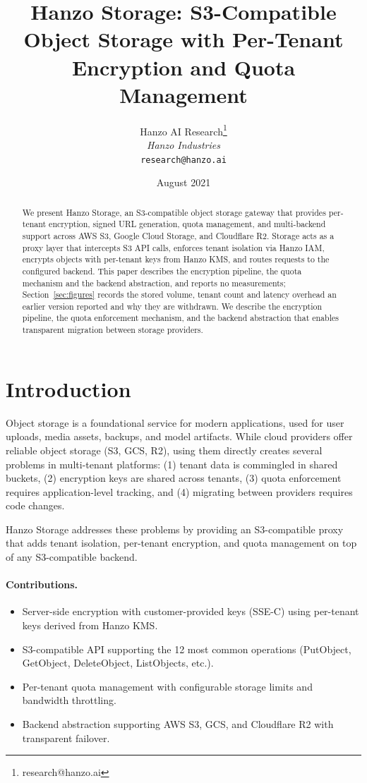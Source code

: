 \documentclass[11pt,twocolumn]{article}
\title{Hanzo Storage: S3-Compatible Object Storage with Per-Tenant Encryption and Quota Management}
\author{Hanzo AI Research\thanks{research@hanzo.ai} \\ \textit{Hanzo Industries} \\ \texttt{research@hanzo.ai}}
\date{August 2021}
\begin{document}
\hanzocoverpage

\begin{abstract}
We present Hanzo Storage, an S3-compatible object storage gateway that provides per-tenant encryption, signed URL generation, quota management, and multi-backend support across AWS S3, Google Cloud Storage, and Cloudflare R2. Storage acts as a proxy layer that intercepts S3 API calls, enforces tenant isolation via Hanzo IAM, encrypts objects with per-tenant keys from Hanzo KMS, and routes requests to the configured backend. This paper describes the encryption pipeline, the quota mechanism and the backend abstraction, and reports no measurements; Section~\ref{sec:figures} records the stored volume, tenant count and latency overhead an earlier version reported and why they are withdrawn. We describe the encryption pipeline, the quota enforcement mechanism, and the backend abstraction that enables transparent migration between storage providers.
\end{abstract}

\section{Introduction}

Object storage is a foundational service for modern applications, used for user uploads, media assets, backups, and model artifacts. While cloud providers offer reliable object storage (S3, GCS, R2), using them directly creates several problems in multi-tenant platforms: (1) tenant data is commingled in shared buckets, (2) encryption keys are shared across tenants, (3) quota enforcement requires application-level tracking, and (4) migrating between providers requires code changes.

Hanzo Storage addresses these problems by providing an S3-compatible proxy that adds tenant isolation, per-tenant encryption, and quota management on top of any S3-compatible backend.

\paragraph{Contributions.}
\begin{itemize}
    \item Server-side encryption with customer-provided keys (SSE-C) using per-tenant keys derived from Hanzo KMS.
    \item S3-compatible API supporting the 12 most common operations (PutObject, GetObject, DeleteObject, ListObjects, etc.).
    \item Per-tenant quota management with configurable storage limits and bandwidth throttling.
    \item Backend abstraction supporting AWS S3, GCS, and Cloudflare R2 with transparent failover.
\end{itemize}
\end{document}
